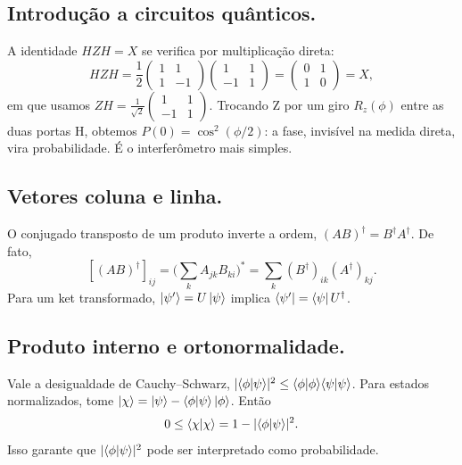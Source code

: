 \subsection{Introdução a circuitos quânticos.}
A identidade $HZH = X$ se verifica por multiplicação direta:
\begin{equation}
    HZH = \frac12 \begin{pmatrix} 1 & 1 \\ 1 & -1 \end{pmatrix}\begin{pmatrix} 1 & 1 \\ -1 & 1 \end{pmatrix} = \begin{pmatrix} 0 & 1 \\ 1 & 0 \end{pmatrix} = X,
\end{equation}
em que usamos $ZH = \frac{1}{\sqrt2}\begin{pmatrix} 1 & 1 \\ -1 & 1 \end{pmatrix}$. Trocando Z por um giro $R_z(\phi)$ entre as duas portas H, obtemos $P(0) = \cos^2(\phi/2)$: a fase, invisível na medida direta, vira probabilidade. É o interferômetro mais simples.

\subsection{Vetores coluna e linha.}
O conjugado transposto de um produto inverte a ordem, $(AB)^\dagger = B^\dagger A^\dagger$. De fato,
\begin{equation}
    \left[(AB)^\dagger\right]_{ij} = \Big(\sum_k A_{jk}B_{ki}\Big)^* = \sum_k (B^\dagger)_{ik}(A^\dagger)_{kj}.
\end{equation}
Para um ket transformado, $\left|{\psi'}\right> = U\left|{\psi}\right>$ implica $\left<{\psi'}\right| = \left<{\psi}\right|U^\dagger$.

\subsection{Produto interno e ortonormalidade.}
Vale a desigualdade de Cauchy--Schwarz, $|\langle {\phi}|{\psi}\rangle|^2 \le \langle {\phi}|{\phi}\rangle\langle {\psi}|{\psi}\rangle$. Para estados normalizados, tome $\left|{\chi}\right> = \left|{\psi}\right> - \langle {\phi}|{\psi}\rangle\left|{\phi}\right>$. Então
\begin{equation}
    0 \le \langle {\chi}|{\chi}\rangle = 1 - |\langle {\phi}|{\psi}\rangle|^2.
\end{equation}
Isso garante que $|\langle {\phi}|{\psi}\rangle|^2$ pode ser interpretado como probabilidade.

